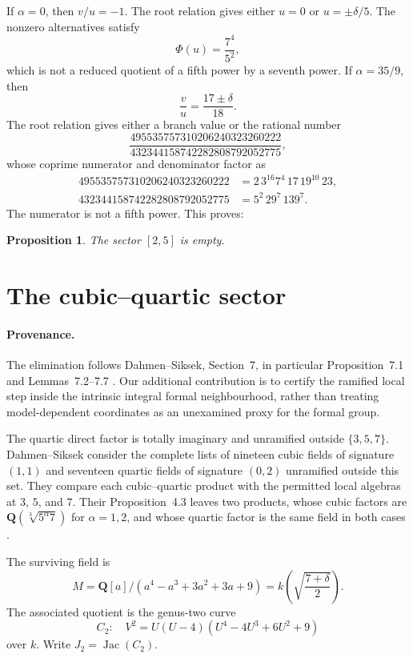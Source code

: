 \documentclass[11pt]{article}
\newcommand{\Q}{\mathbf Q}
\newtheorem{proposition}[theorem]{Proposition}
\theoremstyle{definition}
\theoremstyle{remark}
\begin{document}
If $\alpha=0$, then $v/u=-1$.  The root relation gives either $u=0$ or
$u=\pm\delta/5$.  The nonzero alternatives satisfy
\[
                            \Phi(u)=\frac{7^4}{5^2},
\]
which is not a reduced quotient of a fifth power by a seventh power.  If
$\alpha=35/9$, then
\[
 \frac vu=\frac{17\pm\delta}{18}.
\]
The root relation gives either a branch value or the rational number
\[
 \frac{495535757310206240323260222}
      {432344158742282808792052775},
\]
whose coprime numerator and denominator factor as
\[
\begin{aligned}
495535757310206240323260222
 &=2\,3^{16}7^4\,17\,19^{10}\,23,\\
432344158742282808792052775
 &=5^2\,29^7\,139^7.
\end{aligned}
\]
The numerator is not a fifth power.  This proves:

\begin{proposition}\label{prop:quadratic-sector}
The sector $[2,5]$ is empty.
\end{proposition}

\section{The cubic--quartic sector}\label{sec:reducible-end}

\paragraph{Provenance.}
The elimination follows Dahmen--Siksek, Section~7, in particular
Proposition~7.1 and Lemmas~7.2--7.7 \cite[Section~7]{DahmenSiksek}.
Our additional contribution is to certify the ramified local step inside the
intrinsic integral formal neighbourhood, rather than treating model-dependent
coordinates as an unexamined proxy for the formal group.

The quartic direct factor is totally imaginary and unramified outside
$\{3,5,7\}$.  Dahmen--Siksek consider the complete lists of nineteen cubic
fields of signature $(1,1)$ and seventeen quartic fields of signature
$(0,2)$ unramified outside this set.  They compare each cubic--quartic
product with the permitted local algebras at $3$, $5$, and $7$.
Their Proposition~4.3 leaves two products, whose cubic factors are
$\Q(\sqrt[3]{5^\alpha7})$ for $\alpha=1,2$, and whose quartic factor is the
same field in both cases \cite[Proposition~4.3]{DahmenSiksek}.

The surviving field is
\begin{equation}\label{eq:quartic-field}
 M=\Q[a]/(a^4-a^3+3a^2+3a+9)
  =k\!\left(\sqrt{\frac{7+\delta}{2}}\right).
\end{equation}
The associated quotient is the genus-two curve
\begin{equation}\label{eq:section7-curve}
 C_2:\quad V^2=U(U-4)(U^4-4U^3+6U^2+9)
\end{equation}
over $k$.  Write $J_2=\operatorname{Jac}(C_2)$.
\end{document}

